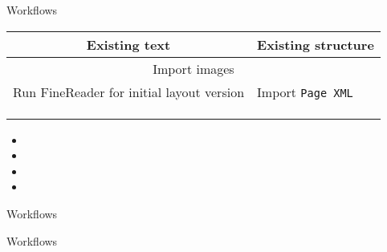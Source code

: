 \documentclass{bbawslides}
\begin{document}
\begin{bbawslide}{Workflows}
  \vspace*{2mm}%
  \centerslidestrue%
  \begin{center}
    \begin{tabular}{|l|l|}
      \hline
      \multicolumn{1}{|c|}{\textbf{Existing text}} & \multicolumn{1}{c|}{\textbf{Existing structure}} \\
      \hline
      \hline
      \multicolumn{2}{|c|}{Import images} \\
      \hline
      Run FineReader for initial layout version & Import \texttt{Page XML} \\
      \hline
      \phantom{Manually correct layout} & \phantom{Run external OCR for initial text version} \\
      \hline
      \multicolumn{2}{|c|}{\bf \phantom{Copy and paste text region by region}} \\
      \hline
      & \phantom{Manually correct text} \\
      \hline
    \end{tabular}
  \end{center}
  \begin{itemize}
    \item
    \item
    \item
    \item
  \end{itemize}
\end{bbawslide}

\begin{bbawslide}{Workflows}
  \vspace*{3mm}%
\end{bbawslide}

\begin{bbawslide}{Workflows}
  \vspace*{3mm}%
\end{bbawslide}
\end{document}
